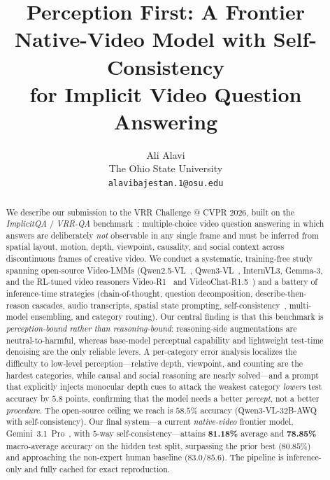 \documentclass[10pt,twocolumn,letterpaper]{article}
\newcommand{\best}[1]{\textbf{#1}}
\begin{document}
\title{Perception First: A Frontier Native-Video Model with Self-Consistency\\
for Implicit Video Question Answering}

\author{Ali Alavi\\
The Ohio State University\\
{\tt\small alavibajestan.1@osu.edu}
}
\maketitle

\begin{abstract}
We describe our submission to the VRR Challenge @ CVPR 2026, built on the \emph{ImplicitQA} /
\emph{VRR-QA} benchmark~\cite{implicitqa}: multiple-choice video question answering in which answers
are deliberately \emph{not} observable in any single frame and must be inferred from spatial layout,
motion, depth, viewpoint, causality, and social context across discontinuous frames of creative
video. We conduct a systematic, training-free study spanning open-source Video-LMMs
(Qwen2.5-VL~\cite{qwen25vl}, Qwen3-VL~\cite{qwen3vl}, InternVL3, Gemma-3, and the RL-tuned video
reasoners Video-R1~\cite{videor1} and VideoChat-R1.5~\cite{videochatr15}) and a battery of
inference-time strategies (chain-of-thought, question decomposition, describe-then-reason cascades,
audio transcripts, spatial state prompting, self-consistency~\cite{selfconsistency}, multi-model
ensembling, and category routing). Our central finding is that this benchmark is
\emph{perception-bound rather than reasoning-bound}: reasoning-side augmentations are
neutral-to-harmful, whereas base-model perceptual capability and lightweight test-time denoising are
the only reliable levers. A per-category error analysis localizes the difficulty to low-level
perception---relative depth, viewpoint, and counting are the hardest categories, while causal and
social reasoning are nearly solved---and a prompt that explicitly injects monocular depth cues to
attack the weakest category \emph{lowers} test accuracy by $5.8$ points, confirming that the model
needs a better \emph{percept}, not a better \emph{procedure}. The open-source ceiling we reach is
$58.5\%$ accuracy (Qwen3-VL-32B-AWQ with self-consistency). Our final system---a current
\emph{native-video} frontier model, Gemini~3.1~Pro~\cite{gemini}, with $5$-way self-consistency---attains
\best{81.18\%} average and \best{78.85\%} macro-average accuracy on the hidden test split, surpassing
the prior best ($80.85\%$) and approaching the non-expert human baseline ($83.0/85.6$). The pipeline is
inference-only and fully cached for exact reproduction.
\end{abstract}
\end{document}
